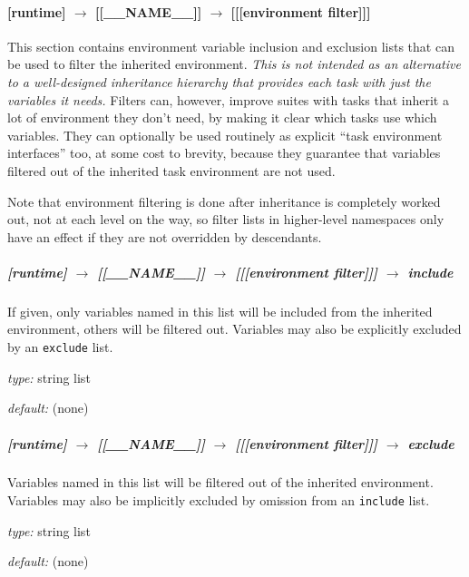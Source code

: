 \paragraph[{[[[}environment filter{]]]}]{ [runtime] $\rightarrow$ [[\_\_NAME\_\_]] $\rightarrow$ [[[environment filter]]]}
\label{EnvironmentFilter}

This section contains environment variable inclusion and exclusion
lists that can be used to filter the inherited environment. {\em This is
not intended as an alternative to a well-designed inheritance hierarchy
that provides each task with just the variables it needs.} Filters can,
however, improve suites with tasks that inherit a lot of environment
they don't need, by making it clear which tasks use which variables.
They can optionally be used routinely as explicit ``task environment
interfaces'' too, at some cost to brevity, because they guarantee that
variables filtered out of the inherited task environment are not used.

Note that environment filtering is done after inheritance is completely
worked out, not at each level on the way, so filter lists in higher-level
namespaces only have an effect if they are not overridden by descendants.

\subparagraph[include]{[runtime] $\rightarrow$ [[\_\_NAME\_\_]] $\rightarrow$ [[[environment filter]]] $\rightarrow$ include}

If given, only variables named in this list will be included from the
inherited environment, others will be filtered out. Variables may also
be explicitly excluded by an \lstinline=exclude= list.

\begin{myitemize}
\item {\em type:} string list
\item {\em default:} (none)
\end{myitemize}

\subparagraph[exclude]{[runtime] $\rightarrow$ [[\_\_NAME\_\_]] $\rightarrow$ [[[environment filter]]] $\rightarrow$ exclude}

Variables named in this list will be filtered out of the inherited
environment.  Variables may also be implicitly excluded by
omission from an \lstinline=include= list.

\begin{myitemize}
\item {\em type:} string list
\item {\em default:} (none)
\end{myitemize}

